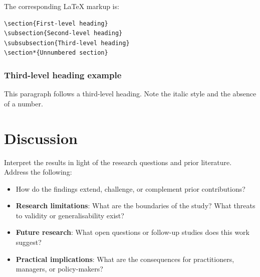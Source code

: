 \documentclass{wpom-upv}
\begin{document}
The corresponding \LaTeX{} markup is:

\begin{verbatim}
\section{First-level heading}
\subsection{Second-level heading}
\subsubsection{Third-level heading}
\section*{Unnumbered section}
\end{verbatim}

\subsubsection{Third-level heading example}

This paragraph follows a third-level heading. Note the italic style and
the absence of a number.


\section{Discussion}

Interpret the results in light of the research questions and prior
literature. Address the following:

\begin{itemize}
	\item How do the findings extend, challenge, or complement prior contributions?
	\item \textbf{Research limitations}: What are the boundaries of the study? What threats to validity or generalisability exist?
	\item \textbf{Future research}: What open questions or follow-up studies does this work suggest?
	\item \textbf{Practical implications}: What are the consequences for practitioners, managers, or policy-makers?
\end{itemize}

\end{document}
